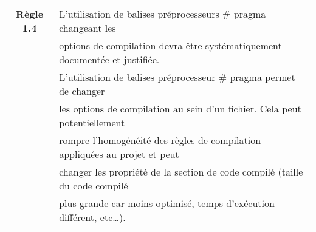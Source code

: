 \medskip

\begin{center}
\begin{tabular}{|c l|}
\hline
\rowcolor{red!10}\textbf{Règle 1.4} & L’utilisation de balises préprocesseurs \# pragma changeant les \\
\rowcolor{red!10} & options de compilation devra être systématiquement documentée et justifiée. \\ \hline
 & L’utilisation de balises préprocesseur \# pragma permet de changer \\
 & les options de compilation au sein d’un fichier. Cela peut potentiellement \\
 & rompre l’homogénéité des règles de compilation appliquées au projet et peut \\
 & changer les propriété de la section de code compilé (taille du code compilé \\
 & plus grande car moins optimisé, temps d’exécution différent, etc…). \\ \hline
\hline
\end{tabular}
\end{center}

\pagebreak